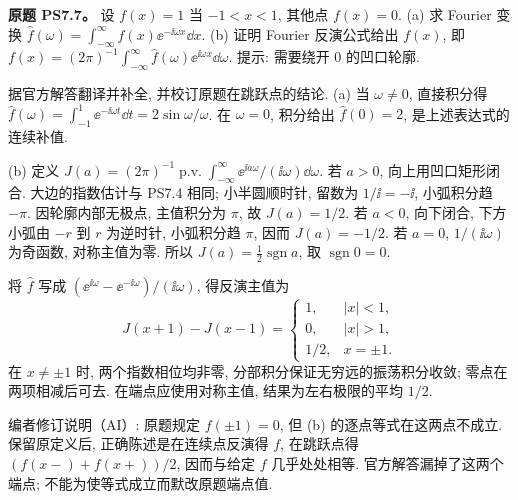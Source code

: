 \begin{exercise}
\textbf{原题 PS7.7。}\label{ass:ps7-7}
设 $f(x)=1$ 当 $-1<x<1$, 其他点 $f(x)=0$.
(a) 求 Fourier 变换 $\widehat f(\omega)=\int_{-\infty}^{\infty}f(x)\ee^{-\ii\omega x}\dd x$.
(b) 证明 Fourier 反演公式给出 $f(x)$, 即 $f(x)=(2\pi)^{-1}\int_{-\infty}^{\infty}\widehat f(\omega)\ee^{\ii\omega x}\dd\omega$. 提示: 需要绕开 $0$ 的凹口轮廓.
\end{exercise}
\begin{solution}
据官方解答翻译并补全, 并校订原题在跳跃点的结论.
(a) 当 $\omega\ne0$, 直接积分得 $\widehat f(\omega)=\int_{-1}^1\ee^{-\ii\omega t}\dd t=2\sin\omega/\omega$. 在 $\omega=0$, 积分给出 $\widehat f(0)=2$, 是上述表达式的连续补值.

(b) 定义 $J(a)=(2\pi)^{-1}\operatorname{p.v.}\int_{-\infty}^{\infty}\ee^{\ii a\omega}/(\ii\omega)\dd\omega$.
若 $a>0$, 向上用凹口矩形闭合. 大边的指数估计与 PS7.4 相同; 小半圆顺时针, 留数为 $1/\ii=-\ii$, 小弧积分趋 $-\pi$. 因轮廓内部无极点, 主值积分为 $\pi$, 故 $J(a)=1/2$. 若 $a<0$, 向下闭合, 下方小弧由 $-r$ 到 $r$ 为逆时针, 小弧积分趋 $\pi$, 因而 $J(a)=-1/2$. 若 $a=0$, $1/(\ii\omega)$ 为奇函数, 对称主值为零. 所以 $J(a)=\tfrac12\operatorname{sgn}a$, 取 $\operatorname{sgn}0=0$.
\begin{center}
\end{center}
将 $\widehat f$ 写成 $(\ee^{\ii\omega}-\ee^{-\ii\omega})/(\ii\omega)$, 得反演主值为
\[
 J(x+1)-J(x-1)=
 \begin{cases}1,&|x|<1,\\0,&|x|>1,\\1/2,&x=\pm1.\end{cases}
\]
在 $x\ne\pm1$ 时, 两个指数相位均非零, 分部积分保证无穷远的振荡积分收敛; 零点在两项相减后可去. 在端点应使用对称主值, 结果为左右极限的平均 $1/2$.

编者修订说明（AI）: 原题规定 $f(\pm1)=0$, 但 (b) 的逐点等式在这两点不成立. 保留原定义后, 正确陈述是在连续点反演得 $f$, 在跳跃点得 $(f(x-)+f(x+))/2$, 因而与给定 $f$ 几乎处处相等. 官方解答漏掉了这两个端点; 不能为使等式成立而默改原题端点值.
\end{solution}

